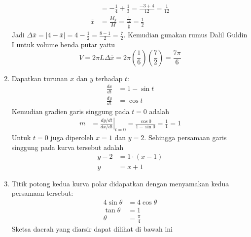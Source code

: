 \documentclass[11pt,openany,a4paper]{article}
\begin{document}
\begin{enumerate}
\begin{align*}
            &= -\frac{1}{4} + \frac{1}{3} = \frac{-3+4}{12} = \frac{1}{12}\\
            \bar{x} &= \frac{M_y}{M} = \frac{\frac{1}{12}}{\frac{1}{6}} = \frac{1}{2}
        \end{align*}
        Jadi $\Delta\bar{x} = |4 - \bar{x}| = 4 - \frac{1}{2} = \frac{8-1}{2} = \frac{7}{2}$. Kemudian gunakan rumus Dalil Guldin I untuk volume benda putar yaitu
        \[
            V = 2\pi L \Delta\bar{x} = 2\pi \left(\frac{1}{6}\right) \left(\frac{7}{2}\right) = \boxed{\frac{7\pi}{6}}
        \]
        \item Dapatkan turunan \( x \) dan \( y \) terhadap \( t \):
        \begin{align*}
            \frac{dx}{dt} &= 1 - \sin t \\
            \frac{dy}{dt} &= \cos t
        \end{align*}
        Kemudian gradien garis singgung pada \( t = 0 \) adalah
        \begin{align*}
            m &= \left.\frac{dy/dt}{dx/dt}\right|_{t=0} = \frac{\cos 0}{1 - \sin 0} = \frac{1}{1} = 1
        \end{align*}
        Untuk $t = 0$ juga diperoleh $x=1$ dan $y=2$. Sehingga persamaan garis singgung pada kurva tersebut adalah
        \begin{align*}
            y - 2 &= 1\cdot(x - 1) \\
            y &= x + 1
        \end{align*}
        \item Titik potong kedua kurva polar didapatkan dengan menyamakan kedua persamaan tersebut:
        \begin{align*}
            4\sin\theta &= 4\cos\theta \\
            \tan\theta &= 1 \\
            \theta &= \frac{\pi}{4}
        \end{align*}
        Sketsa daerah yang diarsir dapat dilihat di bawah ini
        \begin{center}
\end{center}
\end{enumerate}
\end{document}
